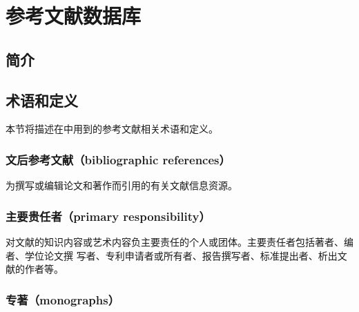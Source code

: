 
\chapter{参考文献数据库}\label{chap:bib}

\section{简介}\label{sec:bib-intro}

\section{术语和定义}\label{sec:bib-glossary}

本节将描述在{\njuthesis}中用到的参考文献相关术语和定义\cite{gbt7714-2005}。

\subsection{文后参考文献（bibliographic references）}

为撰写或编辑论文和著作而引用的有关文献信息资源。

\subsection{主要贵任者（primary responsibility）}

对文献的知识内容或艺术内容负主要责任的个人或团体。主要责任者包括著者、编者、学位论文撰
写者、专利申请者或所有者、报告撰写者、标准提出者、析出文献的作者等。 

\subsection{专著（monographs）}

